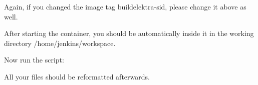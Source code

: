 Again, if you changed the image tag {\ttfamily buildelektra-\/sid}, please change it above as well.

After starting the container, you should be automatically inside it in the working directory {\ttfamily /home/jenkins/workspace}.

Now run the script\+:


\begin{DoxyCode}{0}
\end{DoxyCode}


All your files should be reformatted afterwards. 